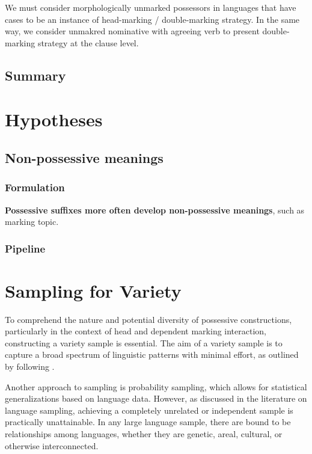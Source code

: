 We must consider morphologically unmarked possessors in languages that have cases to be an instance of head-marking / double-marking strategy. In the same way, we consider unmakred nominative with agreeing verb to present double-marking strategy at the clause level.

\subsection{Summary}



\section{Hypotheses}

\subsection{Non-possessive meanings}

\subsubsection{Formulation}
\textbf{Possessive suffixes more often develop non-possessive meanings}, such as marking topic.

\subsubsection{Pipeline}

\section{Sampling for Variety}

To comprehend the nature and potential diversity of possessive constructions, particularly in the context of head and dependent marking interaction, constructing a variety sample is essential. The aim of a variety sample is to capture a broad spectrum of linguistic patterns with minimal effort, as outlined by \cite{miestamo2016sampling} following \citealt{rijkhoff1993method}.

Another approach to sampling is probability sampling, which allows for statistical generalizations based on language data. However, as discussed in the literature on language sampling, achieving a completely unrelated or independent sample is practically unattainable. In any large language sample, there are bound to be relationships among languages, whether they are genetic, areal, cultural, or otherwise interconnected.

